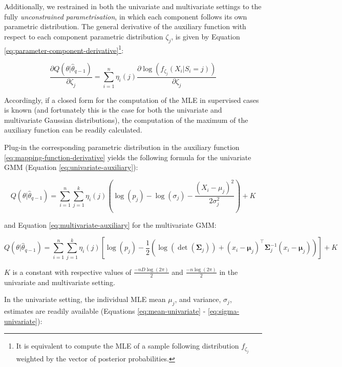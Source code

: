 Additionally, we restrained in both the univariate and
multivariate settings to the fully \emph{unconstrained parametrisation}, in which each component follows its own parametric distribution. The general
derivative of the auxiliary function with respect to each
component parametric distribution \(\zeta_j\), is given by Equation
\eqref{eq:parameter-component-derivative}\footnote{It is equivalent to compute the MLE of a sample following distribution \(f_{\zeta_j}\) weighted by the vector of posterior probabilities.}:

\begin{equation}
\frac{\partial Q(\theta|\hat{\theta}_{q-1})}{\partial \zeta_j}=\sum_{i=1}^n  \eta_{i}(j) \frac{\partial \log (f_{\zeta_j}(X_i|S_i=j))}{\partial \zeta_j}
\label{eq:parameter-component-derivative}
\end{equation}

Accordingly, if a closed form for the computation of the MLE in
supervised cases is known (and fortunately this is the case for both the univariate and multivariate Gaussian distributions), the computation of the maximum of the auxiliary function can be readily calculated.

Plug-in the corresponding parametric distribution in the auxiliary function \eqref{eq:mapping-function-derivative} yields the following formula for the univariate GMM (Equation
\eqref{eq:univariate-auxiliary}):

\begin{equation}
Q(\theta| \hat{\theta}_{q-1}) = \sum_{i=1}^n \sum_{j=1}^k \eta_i(j) \left( \log (p_j) - \log (\sigma_j) - \frac{(X_i-\mu_j)^2}{2\sigma_j^2} \right) + K
\label{eq:univariate-auxiliary}
\end{equation}

and Equation \eqref{eq:multivariate-auxiliary} for the multivariate GMM:

\begin{equation}
Q(\theta| \hat{\theta}_{q-1}) = \sum_{i=1}^n \sum_{j=1}^k \eta_i(j) \left[ \log (p_j) - \frac{1}{2} \left( \log(\operatorname{det}(\boldsymbol{\Sigma}_j)) + (x_i - \boldsymbol{\mu}_j)^\top \boldsymbol{\Sigma}_j^{-1}(x_i - \boldsymbol{\mu}_j)\right) \right] + K
\label{eq:multivariate-auxiliary}
\end{equation}

\(K\) is a constant with respective values of \(\frac{-nD\log(2\pi)}{2}\) and \(\frac{-n\log(2\pi)}{2}\) in the univariate and multivariate setting.

In the univariate setting, the individual MLE mean \(\mu_j\), and variance, \(\sigma_j\), estimates are readily available (Equations \eqref{eq:mean-univariate} - \eqref{eq:sigma-univariate}):


